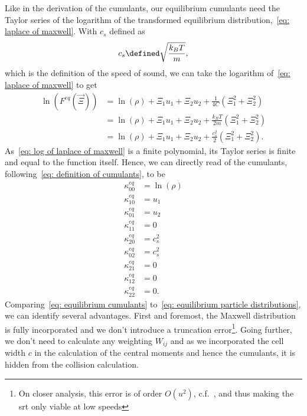 
Like in the derivation of the cumulants, our equilibrium cumulants need the Taylor series of the logarithm of the transformed equilibrium distribution,~\eqref{eq: laplace of maxwell}.
With $c_s$ defined as
\begin{equation}
  c_s \defined \sqrt{\frac{k_B T}{m}},
\end{equation}
which is the definition of the speed of sound, we can take the logarithm of~\eqref{eq: laplace of maxwell} to get
\begin{equation}
  \label{eq: log of laplace of maxwell}
  \begin{aligned}
    \ln(F^{eq}(\vec{\Xi}))
      & = \ln(\rho) + \Xi_1 u_1 + \Xi_2 u_2 + \frac{1}{4C}\left(\Xi_1^2 + \Xi_2^2 \right) \\
      & = \ln(\rho) + \Xi_1 u_1 + \Xi_2 u_2 + \frac{k_B T}{2m}\left(\Xi_1^2 + \Xi_2^2 \right) \\
      & = \ln(\rho) + \Xi_1 u_1 + \Xi_2 u_2 + \frac{c_s^2}{2}\left(\Xi_1^2 + \Xi_2^2 \right).
  \end{aligned}
\end{equation}
As~\eqref{eq: log of laplace of maxwell} is a finite polynomial, its Taylor series is finite and equal to the function itself.
Hence, we can directly read of the cumulants, following~\eqref{eq: definition of cumulants}, to be
\begin{equation}
  \label{eq: equilibrium cumulants}
  \begin{aligned}
    \kappa_{00}^{eq} & = \ln(\rho) \\
    \kappa_{10}^{eq} & = u_1 \\
    \kappa_{01}^{eq} & = u_2 \\
    \kappa_{11}^{eq} & = 0 \\
    \kappa_{20}^{eq} & = c_s^2  \\
    \kappa_{02}^{eq} & = c_s^2  \\
    \kappa_{21}^{eq} & = 0 \\
    \kappa_{12}^{eq} & = 0 \\
    \kappa_{22}^{eq} & = 0.
  \end{aligned}
\end{equation}
Comparing~\eqref{eq: equilibrium cumulants} to~\eqref{eq: equilibrium particle distributions}, we can identify several advantages.
First and foremost, the Maxwell distribution is fully incorporated and we don't introduce a truncation error\footnote{On closer analysis, this error is of order $O(u^2)$, c.f.~\cite[page 178]{wolf2000lattice}, and thus making the \gls{srt} only viable at low speeds}. Going further, we don't need to calculate any weighting $W_{ij}$ and as we incorporated the cell width $c$ in the calculation of the central moments and hence the cumulants, it is hidden from the collision calculation.


